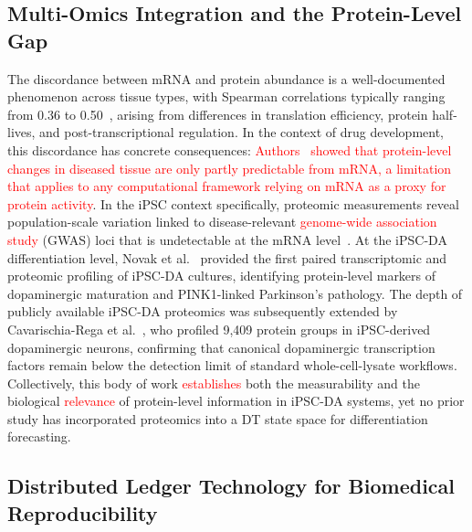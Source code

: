 \documentclass[5p,times,twocolumn]{elsarticle}
\newcommand{\rtag}[1]{}
\newcommand{\rev}[2]{\rtag{#1}\textcolor{red}{#2}}
\newcommand{\lang}[1]{\textcolor{red}{#1}}
\begin{document}
\subsection{\textbf{Multi-Omics Integration and the
    Protein-Level Gap}}

The discordance between mRNA and protein abundance
is a well-documented phenomenon across tissue types,
with Spearman correlations typically ranging from
0.36 to 0.50~\cite{kosti2016cross}, arising from
differences in translation efficiency, protein
half-lives, and post-transcriptional
regulation.
In the context of drug development, this discordance
has concrete consequences: \rev{AC}{Authors~\cite{tasaki2022inferring}
  showed that protein-level changes in diseased tissue are
  only partly predictable from mRNA, a limitation that
  applies to any computational framework relying on mRNA
  as a proxy for protein activity}.
In the iPSC context specifically, proteomic
measurements reveal population-scale variation
linked to disease-relevant \lang{genome-wide association study} (GWAS) loci that is
undetectable at the mRNA level~\cite{mirauta2020population}.
At the iPSC-DA differentiation level, Novak et al.\
\cite{novak2022single} provided the first paired
transcriptomic and proteomic profiling of iPSC-DA
cultures, identifying protein-level markers of
dopaminergic maturation and PINK1-linked
Parkinson's pathology.
The depth of publicly available iPSC-DA proteomics
was subsequently extended by Cavarischia-Rega et al.\
\cite{cavarischia2024proteome}, who profiled 9,409
protein groups in iPSC-derived dopaminergic neurons,
confirming that canonical dopaminergic transcription
factors remain below the detection limit of
standard whole-cell-lysate workflows.
Collectively, this body of work \lang{establishes} both the
measurability and the biological \lang{relevance} of
protein-level information in iPSC-DA systems,
yet no prior study has incorporated proteomics
into a DT state space for differentiation
forecasting.

\subsection{\textbf{Distributed Ledger Technology for
    Biomedical Reproducibility}}
\label{sec:rw_dlt}
\end{document}
